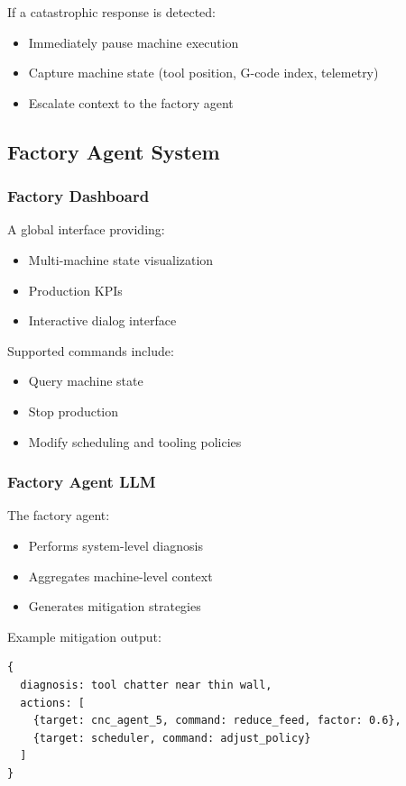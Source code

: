 \documentclass{article}
\begin{document}
If a catastrophic response is detected:
\begin{itemize}
    \item Immediately pause machine execution
    \item Capture machine state (tool position, G-code index, telemetry)
    \item Escalate context to the factory agent
\end{itemize}

\subsection{Factory Agent System}

\subsubsection{Factory Dashboard}

A global interface providing:
\begin{itemize}
    \item Multi-machine state visualization
    \item Production KPIs
    \item Interactive dialog interface
\end{itemize}

Supported commands include:
\begin{itemize}
    \item Query machine state
    \item Stop production
    \item Modify scheduling and tooling policies
\end{itemize}

\subsubsection{Factory Agent LLM}

The factory agent:
\begin{itemize}
    \item Performs system-level diagnosis
    \item Aggregates machine-level context
    \item Generates mitigation strategies
\end{itemize}

Example mitigation output:
\begin{verbatim}
{
  diagnosis: tool chatter near thin wall,
  actions: [
    {target: cnc_agent_5, command: reduce_feed, factor: 0.6},
    {target: scheduler, command: adjust_policy}
  ]
}
\end{verbatim}
\end{document}
